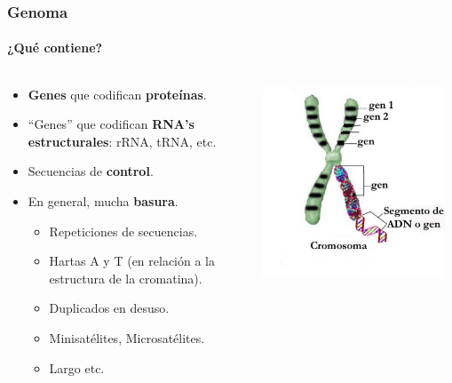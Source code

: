 \begin{frame}
\frametitle{Genoma}
\framesubtitle{¿Qué contiene?}
\begin{columns}
\begin{column}{0.7\textwidth}
	\begin{itemize}
	    \item \textbf{Genes} que codifican \textbf{proteínas}.
	    \item ``Genes'' que codifican \textbf{RNA's estructurales}: rRNA, tRNA, etc.
	    \item Secuencias de \textbf{control}.
	    \item En general, mucha \textbf{basura}.
	    \begin{itemize}
	        \item Repeticiones de secuencias.
	        \item Hartas A y T (en relación a la estructura de la cromatina).
	        \item Duplicados en desuso.
	        \item Minisatélites, Microsatélites.
	        \item Largo etc.
	    \end{itemize}
	\end{itemize}
\end{column}
\begin{column}{0.3\textwidth}
	\includegraphics[width=0.95\textwidth]{img/gen.jpg}
\end{column}
\end{columns}
\end{frame}

